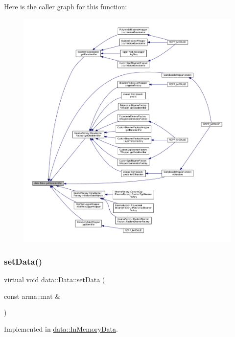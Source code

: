 Here is the caller graph for this function\+:\nopagebreak
\begin{figure}[H]
\begin{center}
\leavevmode
\includegraphics[width=350pt]{classdata_1_1_data_a1af63a4e5aa708de31e1ffdd727a4e16_icgraph}
\end{center}
\end{figure}
\mbox{\label{classdata_1_1_data_a0e928c49b31f803e7984cc24e2f73f70}} 
\subsubsection{\texorpdfstring{set\+Data()}{setData()}}
{\footnotesize\ttfamily virtual void data\+::\+Data\+::set\+Data (\begin{DoxyParamCaption}\item[{const arma\+::mat \&}]{ }\end{DoxyParamCaption})\hspace{0.3cm}{\ttfamily [pure virtual]}}



Implemented in \mbox{\hyperlink{classdata_1_1_in_memory_data_a0456d66f7930809211c75bcdd80a7bca}{data\+::\+In\+Memory\+Data}}.

